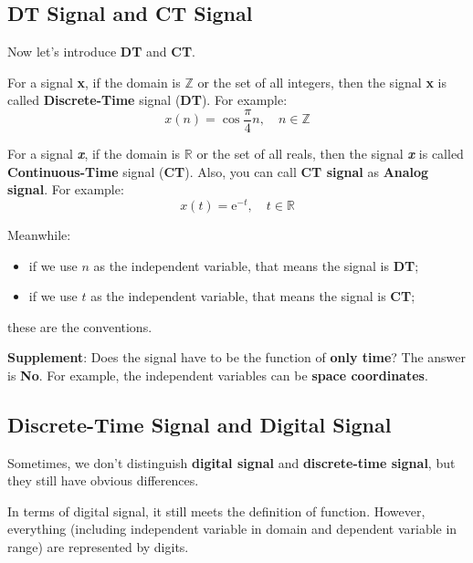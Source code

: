     \newpage
    \subsection{DT Signal and CT Signal}
        Now let's introduce \textbf{DT} and \textbf{CT}.

        For a signal \textbf{x}, if the domain is $\mathbb{Z}$ or the set of all integers, 
        then the signal \textbf{x} is called \textbf{Discrete-Time} signal (\textbf{DT}).
        For example:
            \begin{equation}
                x(n) = \cos \frac{\pi}{4} n,\quad n \in \mathbb{Z}
            \end{equation}
        
        For a signal \textbf{\emph{x}}, if the domain is $\mathbb{R}$ or the set of all reals, 
        then the signal \textbf{\emph{x}} is called \textbf{Continuous-Time} signal (\textbf{CT}).
        Also, you can call \textbf{CT signal} as \textbf{Analog signal}.
        For example:
            \begin{equation}
                x(t) = \mathrm{e}^{-t},\quad t \in \mathbb{R}
            \end{equation}

        Meanwhile:
            \begin{itemize}
                \item if we use $n$ as the independent variable, that means the signal is \textbf{DT};
                \item if we use $t$ as the independent variable, that means the signal is \textbf{CT};
            \end{itemize}
        these are the conventions.

        \textbf{Supplement}: Does the signal have to be the function of \textbf{only time}? The answer is \textbf{No}.
        For example, the independent variables can be \textbf{space coordinates}.
    
    \subsection{Discrete-Time Signal and Digital Signal}
        Sometimes, we don't distinguish \textbf{digital signal} and \textbf{discrete-time signal}, 
        but they still have obvious differences.

        In terms of digital signal, it still meets the definition of function. 
        However, everything (including independent variable in domain and dependent variable in range) are represented by digits.

